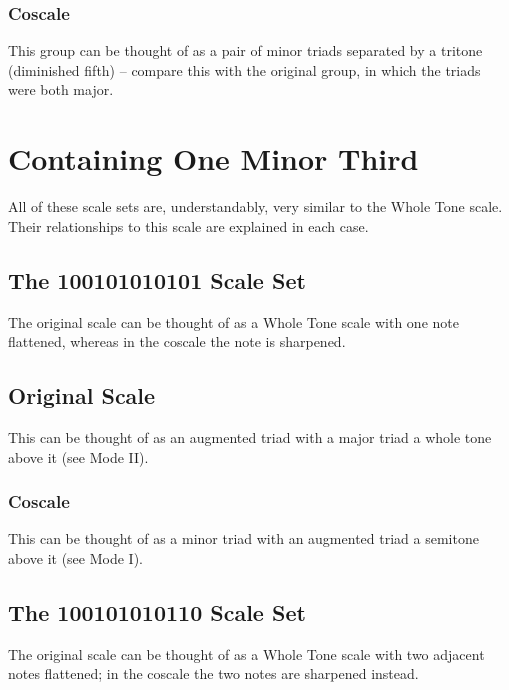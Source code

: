 \documentclass[english]{./gbook}
\begin{document}
\begin{large}
\subsubsection*{Coscale}
This group can be thought of as a pair of minor triads separated by a tritone (diminished fifth) -- compare this with the original group, in which the triads were both major.

\section{Containing One Minor Third}

All of these scale sets are, understandably, very similar to the Whole Tone scale. Their relationships to this scale are explained in each case.

\subsection{The 100101010101 Scale Set}

The original scale can be thought of as a Whole Tone scale with one note flattened, whereas in the coscale the note is sharpened. 

\subsection*{Original Scale}
This can be thought of as an augmented triad with a major triad a whole tone above it (see Mode II).
\subsubsection*{Coscale}
This can be thought of as a minor triad with an augmented triad a semitone above it (see Mode I).

\subsection{The 100101010110 Scale Set}

The original scale can be thought of as a Whole Tone scale with two adjacent notes flattened; in the coscale the two notes are sharpened instead. 


\end{large}
\end{document}
